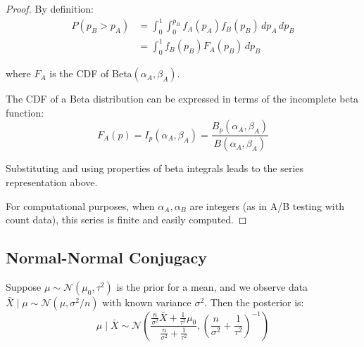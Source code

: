 \begin{proof}
By definition:
\begin{align}
P(p_B > p_A) &= \int_0^1 \int_0^{p_B} f_A(p_A) f_B(p_B) \, dp_A \, dp_B \\
&= \int_0^1 f_B(p_B) F_A(p_B) \, dp_B
\end{align}

where $F_A$ is the CDF of Beta$(\alpha_A, \beta_A)$.

The CDF of a Beta distribution can be expressed in terms of the incomplete beta function:
\begin{equation}
F_A(p) = I_p(\alpha_A, \beta_A) = \frac{B_p(\alpha_A, \beta_A)}{B(\alpha_A, \beta_A)}
\end{equation}

Substituting and using properties of beta integrals leads to the series representation above.

For computational purposes, when $\alpha_A, \alpha_B$ are integers (as in A/B testing with count data), this series is finite and easily computed.
\end{proof}

\subsection{Normal-Normal Conjugacy}

\begin{theorem}
Suppose $\mu \sim \mathcal{N}(\mu_0, \tau^2)$ is the prior for a mean, and we observe data $\bar{X} \mid \mu \sim \mathcal{N}(\mu, \sigma^2/n)$ with known variance $\sigma^2$. Then the posterior is:
\begin{equation}
\mu \mid \bar{X} \sim \mathcal{N}\left(\frac{\frac{n}{\sigma^2}\bar{X} + \frac{1}{\tau^2}\mu_0}{\frac{n}{\sigma^2} + \frac{1}{\tau^2}}, \left(\frac{n}{\sigma^2} + \frac{1}{\tau^2}\right)^{-1}\right)
\end{equation}
\end{theorem}

